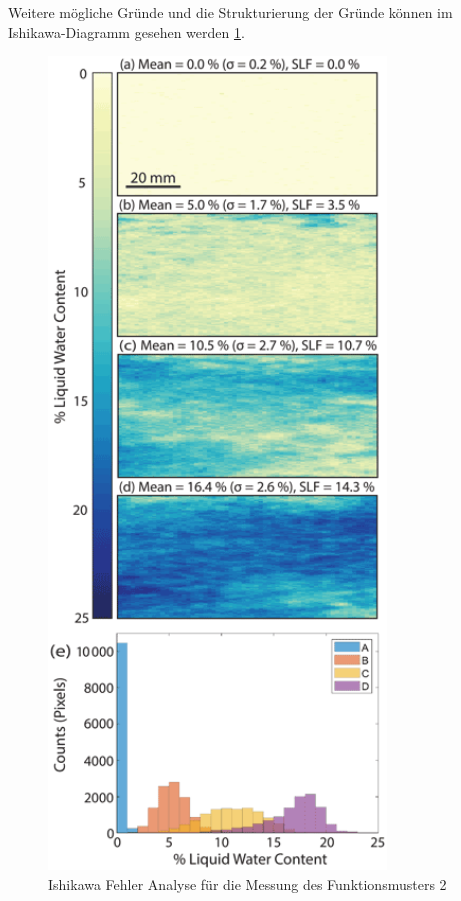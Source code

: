 Weitere mögliche Gründe und die Strukturierung der Gründe können im Ishikawa-Diagramm gesehen werden \ref{fig:IshikwaDavos}.



\begin{figure}
    \centering
    \includegraphics[width=0.8\textwidth]{Bilder/tc-16-43-2022-f08-thumb.png}
    \caption{Ishikawa Fehler Analyse für die Messung des Funktionsmusters 2}
    \label{fig:IshikwaDavos}
\end{figure}

